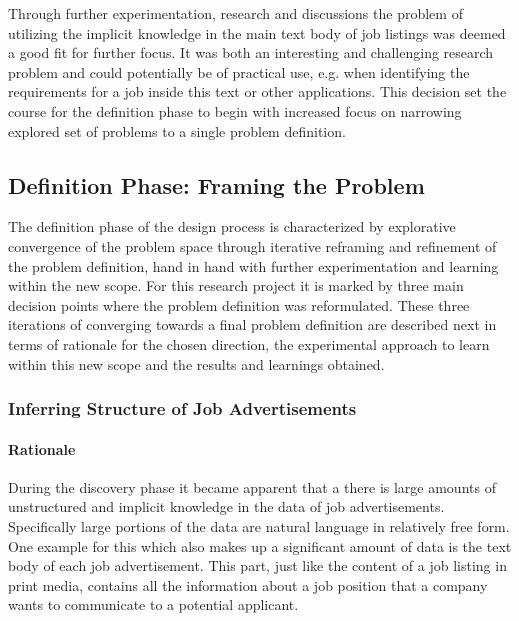 Through further experimentation, research and discussions the problem of utilizing the implicit knowledge in the main text body of job listings was deemed a good fit for further focus. It was both an interesting and challenging research problem and could potentially be of practical use, e.g. when identifying the requirements for a job inside this text or other applications. This decision set the course for the definition phase to begin with increased focus on narrowing explored set of problems to a single problem definition.

\subsection{Definition Phase: Framing the Problem}
\label{sub:Definition Phase: Framing the Problem}

The definition phase of the design process is characterized by explorative convergence of the problem space through iterative reframing and refinement of the problem definition, hand in hand with further experimentation and learning within the new scope. For this research project it is marked by three main decision points where the problem definition was reformulated.
These three iterations of converging towards a final problem definition are described next in terms of rationale for the chosen direction, the experimental approach to learn within this new scope and the results and learnings obtained.

\subsubsection{Inferring Structure of Job Advertisements}
\label{subs:Inferring Structure in Job Advertisements}


\paragraph{Rationale}
\label{par:Rationale}

During the discovery phase it became apparent that a there is large amounts of unstructured and implicit knowledge in the data of job advertisements. Specifically large portions of the data are natural language in relatively free form. One example for this which also makes up a significant amount of data is the text body of each job advertisement. This part, just like the content of a job listing in print media, contains all the information about a job position that a company wants to communicate to a potential applicant.

